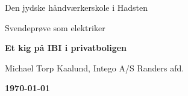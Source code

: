 \begin{titlepage}
    \centering
    {\LARGE Den jydske håndværkerskole i Hadsten \par}
    \vspace{1cm}
    {\Large Svendeprøve som elektriker \par}
    \vspace{1.5cm}
    {\huge\bfseries Et kig på IBI i privatboligen \par}
    \vspace{10cm}
    { Michael Torp Kaalund, Intego A/S Randers afd. \par}
    \vfill
    {\bfseries \today\par}
\end{titlepage}
